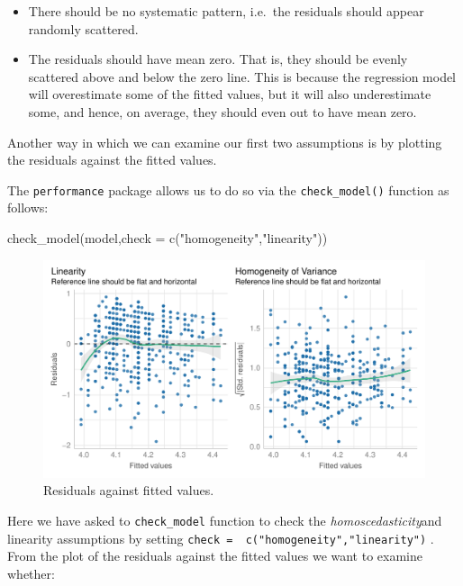 \documentclass[
  letterpaper,
  DIV=11,
  numbers=noendperiod]{scrartcl}
\newenvironment{Shaded}{\begin{snugshade}}{\end{snugshade}}
\newcommand{\AttributeTok}[1]{\textcolor[rgb]{0.40,0.45,0.13}{#1}}
\newcommand{\FunctionTok}[1]{\textcolor[rgb]{0.28,0.35,0.67}{#1}}
\newcommand{\NormalTok}[1]{\textcolor[rgb]{0.00,0.23,0.31}{#1}}
\newcommand{\StringTok}[1]{\textcolor[rgb]{0.13,0.47,0.30}{#1}}
\providecommand{\tightlist}{%
  \setlength{\itemsep}{0pt}\setlength{\parskip}{0pt}}\usepackage{longtable,booktabs,array}
\begin{document}
\begin{itemize}
\tightlist
\item
  There should be no systematic pattern, i.e.~the residuals should
  appear randomly scattered.
\item
  The residuals should have mean zero. That is, they should be evenly
  scattered above and below the zero line. This is because the
  regression model will overestimate some of the fitted values, but it
  will also underestimate some, and hence, on average, they should even
  out to have mean zero.
\end{itemize}

Another way in which we can examine our first two assumptions is by
plotting the residuals against the fitted values.

The \texttt{performance} package allows us to do so via the
\texttt{check\_model()} function as follows:

\begin{Shaded}
\begin{Highlighting}[]
\FunctionTok{check\_model}\NormalTok{(model,}\AttributeTok{check =} \FunctionTok{c}\NormalTok{(}\StringTok{"homogeneity"}\NormalTok{,}\StringTok{"linearity"}\NormalTok{))}
\end{Highlighting}
\end{Shaded}

\begin{figure}[H]

{\centering \includegraphics{index_files/figure-pdf/unnamed-chunk-8-1.pdf}

}

\caption{Residuals against fitted values.}

\end{figure}%

Here we have asked to \texttt{check\_model} function to check the
\emph{homoscedasticity}and linearity assumptions by setting
\texttt{check\ =\ \ c("homogeneity","linearity")} . From the plot of the
residuals against the fitted values we want to examine whether:
\end{document}
